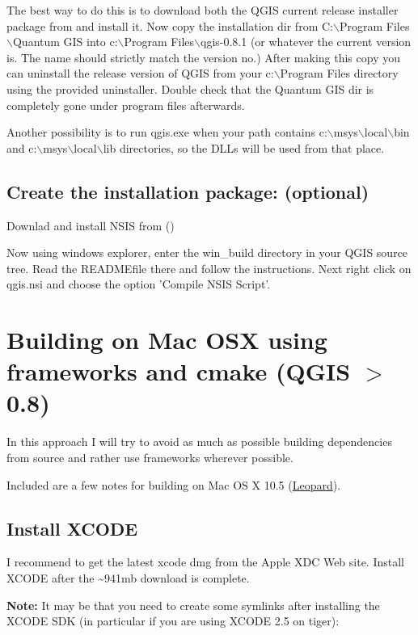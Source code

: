 The best way to do this is to download both the QGIS current release installer
package from  and install it. Now copy
the installation dir from C:$\backslash$Program Files$\backslash$Quantum GIS into c:$\backslash$Program
Files$\backslash$qgis-0.8.1 (or whatever the current version is. The name should strictly
match the version no.) After making this copy you can uninstall the release
version of QGIS from your c:$\backslash$Program Files directory using the provided
uninstaller. Double check that the Quantum GIS dir is completely gone under
program files afterwards.

Another possibility is to run qgis.exe when your path contains
c:$\backslash$msys$\backslash$local$\backslash$bin and c:$\backslash$msys$\backslash$local$\backslash$lib directories, so the DLLs will be
used from that place.

\subsection{Create the installation package: (optional)}
Downlad and install NSIS from ()

Now using windows explorer, enter the win\_build directory in your QGIS source
tree. Read the READMEfile there and follow the instructions. Next right click
on qgis.nsi and choose the option 'Compile NSIS Script'. 


\section{Building on Mac OSX using frameworks and cmake (QGIS $>$ 0.8)}
In this approach I will try to avoid as much as possible building dependencies
from source and rather use frameworks wherever possible.

Included are a few notes for building on Mac OS X 10.5 (\underline{Leopard}).

\subsection{Install XCODE}
I recommend to get the latest xcode dmg from the Apple XDC Web site. Install
XCODE after the \~{}941mb download is complete.

\textbf{Note:} It may be that you need to create some symlinks after installing 
the XCODE SDK (in particular if you are using XCODE 2.5 on tiger):

